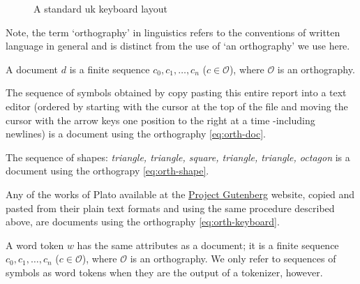 \begin{figure}[!ht]
 \centering
 
 \caption{A standard uk keyboard layout}
 \label{fig:uk-keyboard}
\end{figure}

Note, the term `orthography' in linguistics refers to the conventions of written language in general and is distinct from the use of `an orthography' we use here.

\begin{definition}[document]
  A document $d$ is a finite sequence $c_0,c_1,\dots,c_n$ ($c\in\mathscr{O}$), where $\mathscr{O}$ is an orthography.
\end{definition}

\begin{example}\label{ex:doc-report}
    The sequence of symbols obtained by copy pasting this entire report into a text editor (ordered by starting with the cursor at the top of the file and moving the cursor with the arrow keys one position to the right at a time -including newlines) is a document using the orthography \ref{eq:orth-doc}.
\end{example}
\vspace{6pt}

\begin{example}\label{ex:doc-shapes}
    The sequence of shapes: \emph{triangle, triangle, square, triangle, triangle, octagon} is a document using the orthograpy \ref{eq:orth-shape}.
\end{example}
\vspace{6pt}

\begin{example}\label{ex:doc-plato}
    Any of the works of Plato available at the \href{https://www.gutenberg.org/ebooks/author/93}{Project Gutenberg} website, copied and pasted from their plain text formats and using the same procedure described above, are documents using the orthography \ref{eq:orth-keyboard}.
\end{example}

\begin{definition}
  A word token $w$ has the same attributes as a document; it is a finite sequence $c_0,c_1,\dots,c_n$ ($c\in\mathscr{O}$), where $\mathscr{O}$ is an orthography. We only refer to sequences of symbols as word tokens when they are the output of a tokenizer, however.
\end{definition}

